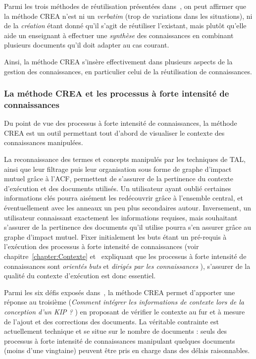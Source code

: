\bigskip

Parmi les trois méthodes de réutilisation présentées dans~\cite{petter2009developing}, on peut affirmer que la méthode CREA n'est ni un \textit{verbatim} (trop de variations dans les situations), ni de la \textit{création} étant donné qu'il s'agit de réutiliser l'existant, mais plutôt qu'elle aide un enseignant à effectuer une \textit{synthèse} des connaissances en combinant plusieurs documents qu'il doit adapter au cas courant.

\bigskip

Ainsi, la méthode CREA s'insère effectivement dans plusieurs aspects de la gestion des connaissances, en particulier celui de la réutilisation de connaissances.




\subsubsection{La méthode CREA et les processus à forte intensité de connaissances}
\label{subsubsection:Evaluation:Discussions:DiscussionsDomaines:KIP}

Du point de vue des processus à forte intensité de connaissances, la méthode CREA est un outil permettant tout d'abord de visualiser le contexte des connaissances manipulées.

La reconnaissance des termes et concepts manipulés par les techniques de TAL, ainsi que leur filtrage puis leur organisation sous forme de graphe d'impact mutuel grâce à l'ACF, permettent de s'assurer de la pertinence du contexte d'exécution et des documents utilisés.
Un utilisateur ayant oublié certaines informations clés pourra aisément les redécouvrir grâce à l'ensemble central, et éventuellement avec les anneaux un peu plus secondaires autour.
Inversement, un utilisateur connaissant exactement les informations requises, mais souhaitant s'assurer de la pertinence des documents qu'il utilise pourra s'en assurer grâce au graphe d'impact mutuel.
Fixer initialement les buts étant un pré-requis à l'exécution des processus à forte intensité de connaissances (voir chapitre~\ref{chapter:Contexte} et~\cite{di2015knowledge} expliquant que les processus à forte intensité de connaissances sont \og \textit{orientés buts} \fg et \og \textit{dirigés par les connaissances} \fg), s'assurer de la qualité du contexte d'exécution est donc essentiel.

Parmi les six défis exposés dans~\cite{boissier2019challenges}, la méthode CREA permet d'apporter une réponse au troisième (\og \textit{Comment intégrer les informations de contexte lors de la conception d’un KIP ?} \fg) en proposant de vérifier le contexte au fur et à mesure de l'ajout et des corrections des documents.
La véritable contrainte est actuellement technique et se situe sur le nombre de documents : seuls des processus à forte intensité de connaissances manipulant quelques documents (moins d'une vingtaine) peuvent être pris en charge dans des délais raisonnables.


